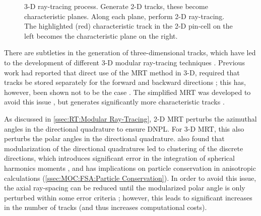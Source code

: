 {{{{          \begin{figure}[h]
            \centering
            \def\svgwidth{0.85\linewidth}
            
            \caption{3-D ray-tracing process. Generate 2-D tracks, these become characteristic planes. Along each plane, perform 2-D ray-tracing. The highlighted (red) characteristic track in the 2-D pin-cell on the left becomes the characteristic plane on the right.}
            \label{fig:RT:3-D Ray-tracing}
          \end{figure}

          There are subtleties in the generation of three-dimensional tracks, which have led to the development of different 3-D modular ray-tracing techniques \cite{Kochunas2013,Shaner2015,3DMOCCasl}.
          Previous work had reported that direct use of the \ac{MRT} method in 3-D, required that tracks be stored separately for the forward and backward directions \cite{Kochunas2013};
          this has, however, been shown not to be the case \cite{Shaner2015}.
          The simplified \ac{MRT} was developed to avoid this issue \cite{Kochunas2013}, but generates significantly more characteristic tracks \cite{Shaner2015}.

          As discussed in \cref{ssec:RT:Modular Ray-Tracing}, 2-D \ac{MRT} perturbs the azimuthal angles in the directional quadrature to ensure \ac{DNPL}.
          For 3-D \ac{MRT}, this also perturbs the polar angles in the directional quadrature.
          \citet{Kochunas2013,3DMOCCasl} also found that modularization of the directional quadratures led to clustering of the discrete directions, which introduces significant error in the integration of spherical harmonics moments \cite{Kochunas2013}, and has implications on particle conservation in anisotropic calculations (\cref{ssec:MOC:FSA:Particle Conservation}).
          In order to avoid this issue, the axial ray-spacing can be reduced until the modularized polar angle is only perturbed within some error criteria \cite{Kochunas2013}; however, this leads to significant increases in the number of tracks (and thus increases computational costs).
        }

}}}
